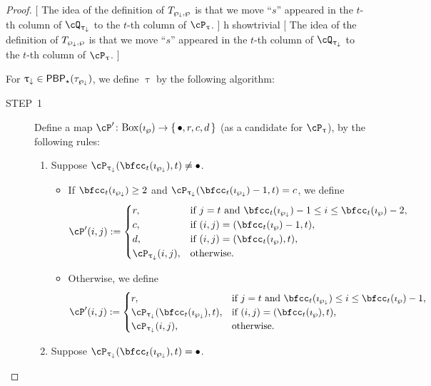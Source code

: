 \documentclass[12pt,a4paper]{amsart}
\newcommand{\trivial}[2][]{\if\relax\detokenize{#1}\relax
  {%
      \color{orange} \vspace{0em} $[$  #2 $]$
      \color{black}
  }
  \else
\ifx#1h
\ifcsname showtrivial\endcsname
{%
    \color{orange} \vspace{0em}  $[$ #2 $]$
    \color{black}
}
\fi
\else {\red Wrong argument!} \fi
\fi
}
\numberwithin{equation}{section}
\theoremstyle{remark}
\def\BOX#1{\mathrm{Box}(#1)}
\def\PBPs{\mathsf{PBP}_{\star}}
\begin{document}
\begin{proof}
  \trivial[]{
    The idea of the definition of $T_{\wp_{\downarrow},\wp}$ is that we move ``$s$'' appeared
    in the $t$-th column of $\cQ_{\uptaum}$ to the $t$-th column of
    $\cP_{\uptau}$.
  }

  For $\uptaum\in \PBPs(\tau_{\PPm})$, we define $\uptau$ by the following algorithm:
  \begin{description}
    \item[STEP~1] Define a map
          $\cP'\colon \BOX{\imath_{\wp}}\rightarrow \set{\bullet,r,c,d}$ (as a candidate for $\cP_{\uptau}$), by the following rules:
          \begin{enumerate}[label=(\alph*)]
            \item Suppose
            $\cP_{\uptaum}(\bfcc_{t}(\imath_{\PPm}),t)\neq \bullet$.
            \begin{itemize}
              \item If $\bfcc_{t}(\imath_{\PPm})\geq 2$ and
              $\cP_{\uptaum}(\bfcc_{t}(\imath_{\PPm})-1,t) = c$,
              we define
              \[
                \cP'(i,j) := \begin{cases}
                  r ,& \text{if $j=t$ and $\bfcc_{t}(\imath_{\PPm})-1
                    \leq i \leq \bfcc_{t}(\imath_{\wp})-2$},\\
                  c ,& \text{if $(i,j)=(\bfcc_{t}(\imath_{\wp})-1,t)$},\\
                  d ,& \text{if $(i,j)=(\bfcc_{t}(\imath_{\wp}),t)$},\\
                  \cP_{\uptaum}(i,j) ,&\text{otherwise}.
                \end{cases}
              \]
              \item Otherwise, we define
              \[
                \cP'(i,j) := \begin{cases}
                  r ,& \text{if $j=t$ and $\bfcc_{t}(\imath_{\PPm})
                    \leq i \leq \bfcc_{t}(\imath_{\wp})-1$},\\
                  \cP_{\uptaum}(\bfcc_{t}(\imath_{\PPm}),t) ,&
                  \text{if $(i,j)=(\bfcc_{t}(\imath_{\wp}),t)$},\\
                  \cP_{\uptaum}(i,j) ,&\text{otherwise}.
                \end{cases}
              \]
            \end{itemize}
            \item Suppose $\cP_{\uptaum}(\bfcc_{t}(\imath_{\PPm}),t)=\bullet$.
            \begin{itemize}

\end{itemize}
\end{enumerate}
\end{description}
\end{proof}
\end{document}
